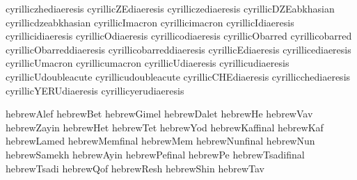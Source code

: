  cyrilliczhediaeresis       {}
 cyrillicZEdiaeresis        {}
 cyrilliczediaeresis        {}
 cyrillicDZEabkhasian       {}
 cyrillicdzeabkhasian       {}
 cyrillicImacron            {}
 cyrillicimacron            {}
 cyrillicIdiaeresis         {}
 cyrillicidiaeresis         {}
 cyrillicOdiaeresis         {}
 cyrillicodiaeresis         {}
 cyrillicObarred            {}
 cyrillicobarred            {}
 cyrillicObarreddiaeresis   {}
 cyrillicobarreddiaeresis   {}
 cyrillicEdiaeresis         {}
 cyrillicediaeresis         {}
 cyrillicUmacron            {}
 cyrillicumacron            {}
 cyrillicUdiaeresis         {}
 cyrillicudiaeresis         {}
 cyrillicUdoubleacute       {}
 cyrillicudoubleacute       {}
 cyrillicCHEdiaeresis       {}
 cyrillicchediaeresis       {}
 cyrillicYERUdiaeresis      {}
 cyrillicyerudiaeresis      {}


\startencoding[uc]

 hebrewAlef       {} %
 hebrewBet        {}
 hebrewGimel      {}
 hebrewDalet      {}
 hebrewHe         {}
 hebrewVav        {}
 hebrewZayin      {}
 hebrewHet        {}
 hebrewTet        {}
 hebrewYod        {}
 hebrewKaffinal   {}
 hebrewKaf        {}
 hebrewLamed      {}
 hebrewMemfinal   {}
 hebrewMem        {}
 hebrewNunfinal   {}
 hebrewNun        {}
 hebrewSamekh     {}
 hebrewAyin       {}
 hebrewPefinal    {}
 hebrewPe         {}
 hebrewTsadifinal {}
 hebrewTsadi      {}
 hebrewQof        {}
 hebrewResh       {}
 hebrewShin       {}
 hebrewTav        {} %

\stopencoding

\endinput
